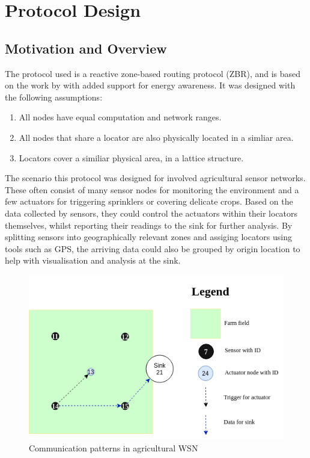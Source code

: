\documentclass[12pt]{article}
\begin{document}
\pagebreak
\section{Protocol Design} \label{protodesign}

\subsection{Motivation and Overview}

The protocol used is a reactive zone-based routing protocol (ZBR), and is based on the work by \cite{zbrp} with added support for energy awareness. It was designed with the following assumptions:

\begin{enumerate}
	\item All nodes have equal computation and network ranges.
	\item All nodes that share a locator are also physically located in a simliar area.
	\item Locators cover a similiar physical area, in a lattice structure.
\end{enumerate}

The scenario this protocol was designed for involved agricultural sensor networks. These often consist of many sensor nodes for monitoring the environment and a few actuators for triggering sprinklers or covering delicate crops. Based on the data collected by sensors, they could control the actuators within their locators themselves, whilst reporting their readings to the sink for further analysis. By splitting sensors into geographically relevant zones and assiging locators using tools such as GPS, the arriving data could also be grouped by origin location to help with visualisation and analysis at the sink. 

\begin{figure}[!ht]
	\centering
	\includegraphics[width=0.8\linewidth]{images/actuate}
	\caption{Communication patterns in agricultural WSN}
	\label{fig:actuate}
\end{figure}
\end{document}
